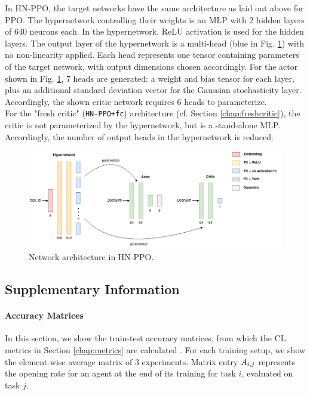 \documentclass[dvipsnames]{article} %
\newcommand{\comment}[1]{}
\newcommand{\ps}[1] {\comment{{\color {purple} PS: #1}}}             %
\newcommand{\sa}[1] {\comment{{\color{cyan} SA: #1}}}                %
\begin{document}
In HN-PPO, the target networks have the same architecture as laid out above for PPO. The hypernetwork controlling their weights is an MLP with 2 hidden layers of 640 \sa{or 64?} \ps{640 is correct, it's 10x the TN size} neurons each. In the hypernetwork, ReLU activation is used for the hidden layers. The output layer of the hypernetwork is a multi-head (blue in Fig. \ref{hnet-arch}) with no non-linearity applied. Each head represents one tensor containing parameters of the target network, with output dimensions chosen accordingly. For the actor shown in Fig. \ref{hnet-arch}, 7 heads are generated: a weight and bias tensor for each layer, plus an additional standard deviation vector for the Gaussian stochasticity layer. Accordingly, the shown critic network requires 6 heads to parameterize.\\
For the "fresh critic" (\texttt{HN-PPO+fc}) architecture (cf. Section \ref{chap:freshcritic}), the critic is not parameterized by the hypernetwork, but is a stand-alone MLP. Accordingly, the number of output heads in the hypernetwork is reduced.

\sa{I think this can be moved into the methods section.} \ps{Is here because it's one of the first things to go if I exceed the length. Will move depending on space requirements at the end}

\begin{figure}[htbp]
\begin{center}
\includegraphics[width=0.8\linewidth]{images/hnet_arch.png}
\end{center}
\caption{Network architecture in HN-PPO.}
\label{hnet-arch}
\end{figure}

\subsection{Supplementary Information}
\paragraph{Accuracy Matrices}
In this section, we show the train-test accuracy matrices, from which the CL metrics in Section \ref{chap:metrics} are calculated \citep{moreThanForgetting}. For each training setup, we show the element-wise average matrix of 3 experiments. Matrix entry ${A}_{i,j}$ represents the opening rate for an agent at the end of its training for task $i$, evaluated on task $j$. 
\end{document}
